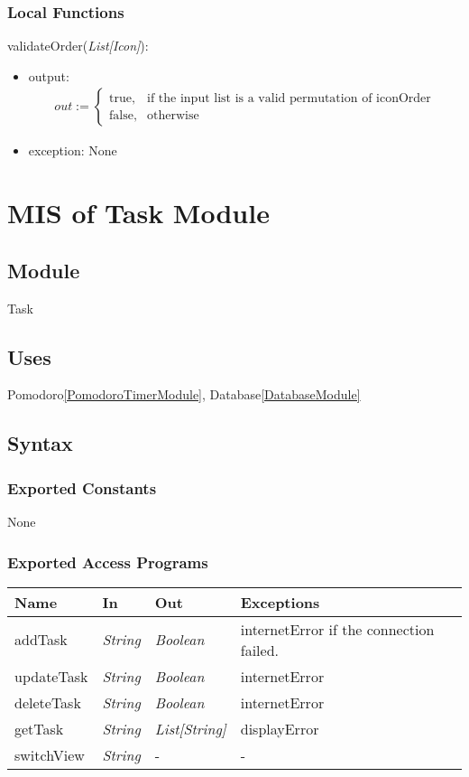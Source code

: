 \documentclass[12pt, titlepage]{article}
\begin{document}
\subsubsection{Local Functions}
\noindent validateOrder(\textit{List[Icon]}):
\begin{itemize}
\item output: 
\[
\begin{array}{l}
out := \begin{cases}
\text{true}, & \text{if the input list is a valid permutation of iconOrder} \\
\text{false}, & \text{otherwise}
\end{cases}
\end{array}
\]
\item exception: None
\end{itemize}

\newpage
\section{MIS of Task Module} \label{TaskModule}

\subsection{Module}
Task

\subsection{Uses}
Pomodoro\ref{PomodoroTimerModule}, Database\ref{DatabaseModule}
\
\subsection{Syntax}

\subsubsection{Exported Constants}
None

\subsubsection{Exported Access Programs}

\begin{center}
\begin{tabular}{p{4cm} p{3cm} p{3cm} p{3cm}}
\hline
\textbf{Name} & \textbf{In} & \textbf{Out} & \textbf{Exceptions} \\
\hline
addTask&  \textit{String} & \textit{Boolean} & internetError if the connection failed. \\
updateTask&  \textit{String} & \textit{Boolean} & internetError \\
deleteTask&  \textit{String} & \textit{Boolean} & internetError \\
getTask&  \textit{String} & \textit{List[String]} & displayError \\
switchView & \textit{String} & - & - \\
\hline
\end{tabular}
\end{center}
\end{document}
